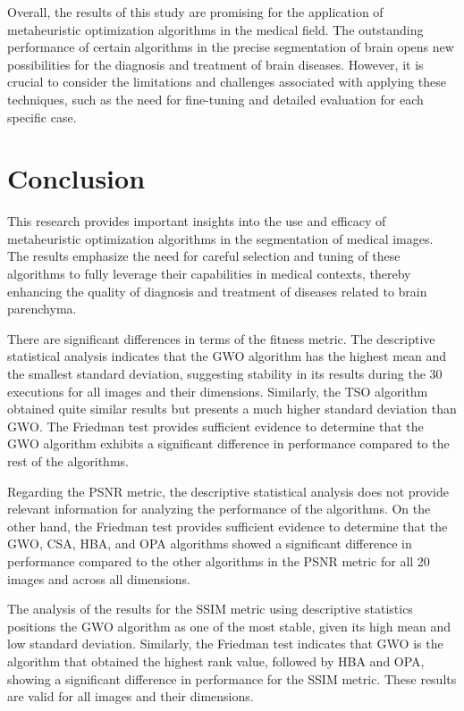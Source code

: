 \documentclass{elsarticle}
\begin{document}
Overall, the results of this study are promising for the application of metaheuristic optimization algorithms in the medical field. The outstanding performance of certain algorithms in the precise segmentation of brain opens new possibilities for the diagnosis and treatment of brain diseases. However, it is crucial to consider the limitations and challenges associated with applying these techniques, such as the need for fine-tuning and detailed evaluation for each specific case.

\section{Conclusion} \label{sec:co}

This research provides important insights into the use and efficacy of metaheuristic optimization algorithms in the segmentation of medical images. The results emphasize the need for careful selection and tuning of these algorithms to fully leverage their capabilities in medical contexts, thereby enhancing the quality of diagnosis and treatment of diseases related to brain parenchyma.

There are significant differences in terms of the fitness metric. The descriptive statistical analysis indicates that the GWO algorithm has the highest mean and the smallest standard deviation, suggesting stability in its results during the 30 executions for all images and their dimensions. Similarly, the TSO algorithm obtained quite similar results but presents a much higher standard deviation than GWO. The Friedman test provides sufficient evidence to determine that the GWO algorithm exhibits a significant difference in performance compared to the rest of the algorithms.

Regarding the PSNR metric, the descriptive statistical analysis does not provide relevant information for analyzing the performance of the algorithms. On the other hand, the Friedman test provides sufficient evidence to determine that the GWO, CSA, HBA, and OPA algorithms showed a significant difference in performance compared to the other algorithms in the PSNR metric for all 20 images and across all dimensions.

The analysis of the results for the SSIM metric using descriptive statistics positions the GWO algorithm as one of the most stable, given its high mean and low standard deviation. Similarly, the Friedman test indicates that GWO is the algorithm that obtained the highest rank value, followed by HBA and OPA, showing a significant difference in performance for the SSIM metric. These results are valid for all images and their dimensions.
\end{document}
